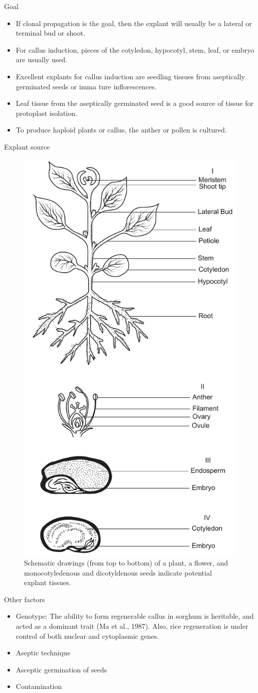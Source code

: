 \documentclass[
  ignorenonframetext,
  aspectratio=169]{beamer}
\providecommand{\tightlist}{%
  \setlength{\itemsep}{0pt}\setlength{\parskip}{0pt}}
\begin{document}
\begin{frame}{Goal}
\protect\hypertarget{goal}{}
\begin{itemize}
\tightlist
\item
  If clonal propagation is the goal, then the explant will usually be a
  lateral or terminal bud or shoot.
\item
  For callus induction, pieces of the cotyledon, hypocotyl, stem, leaf,
  or embryo are usually used.
\item
  Excellent explants for callus induction are seedling tissues from
  aseptically germinated seeds or imma ture inflorescences.
\item
  Leaf tissue from the aseptically germinated seed is a good source of
  tissue for protoplast isolation.
\item
  To produce haploid plants or callus, the anther or pollen is cultured.
\end{itemize}
\end{frame}

\begin{frame}{Explant source}
\protect\hypertarget{explant-source}{}
\begin{figure}
\includegraphics[width=0.2\linewidth]{../images/explant_sources} \caption{Schematic drawings (from top to bottom) of a plant, a flower, and monocotyledenous and dicotyldenous seeds indicate potential explant tissues.}\label{fig:explant-source}
\end{figure}
\end{frame}

\begin{frame}{Other factors}
\protect\hypertarget{other-factors}{}
\begin{itemize}
\tightlist
\item
  Genotype: The ability to form regenerable callus in sorghum is
  heritable, and acted as a dominant trait (Ma et al., 1987). Also, rice
  regeneration is under control of both nuclear and cytoplasmic genes.
\item
  Aseptic technique
\item
  Asceptic germination of seeds
\item
  Contamination
\end{itemize}
\end{frame}
\end{document}
